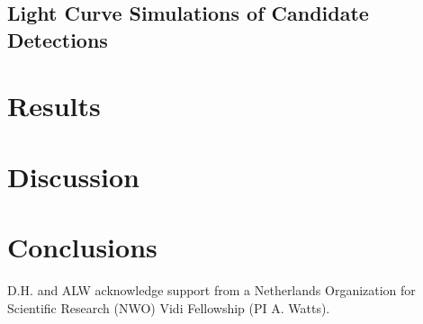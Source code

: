 \documentclass[numberedappendix]{emulateapj}
\begin{document}
\subsection{Light Curve Simulations of Candidate Detections}

\section{Results}
\label{sec:results}



\section{Discussion}
\label{sec:discussion}

\section{Conclusions}


\acknowledgments
D.H. and ALW acknowledge support from a Netherlands Organization for Scientific Research (NWO) Vidi Fellowship (PI A. Watts).  




\end{document}
